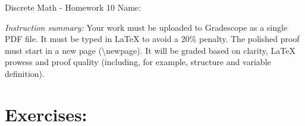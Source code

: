 \documentclass[12pt]{article}
\begin{document}
\begin{center}
    {\LARGE Discrete Math - Homework 10}  \Large \newline
    Name:
\end{center}

\noindent \emph{Instruction summary:} Your work must be uploaded to Gradescope as a single PDF file. It must be typed in LaTeX to avoid a 20\% penalty. The polished proof must start in a new page (\textbackslash{newpage}). It will be graded based on clarity, LaTeX prowess and proof quality (including, for example, structure and variable definition).

\section*{Exercises:}
\end{document}
